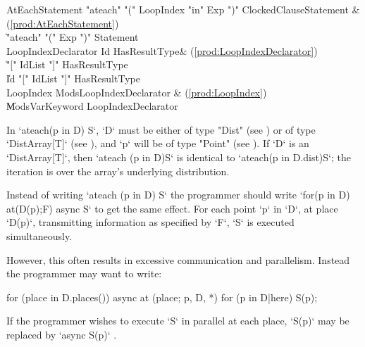 \begin{bbgrammar}
     AtEachStatement \: \xcd"ateach" \xcd"(" LoopIndex \xcd"in" Exp \xcd")" ClockedClause\opt Statement & (\ref{prod:AtEachStatement}) \\
                    \| \xcd"ateach" \xcd"(" Exp \xcd")" Statement \\
 LoopIndexDeclarator \: Id HasResultType\opt & (\ref{prod:LoopIndexDeclarator}) \\
                    \| \xcd"[" IdList \xcd"]" HasResultType\opt \\
                    \| Id \xcd"[" IdList \xcd"]" HasResultType\opt \\
           LoopIndex \: Mods\opt LoopIndexDeclarator & (\ref{prod:LoopIndex}) \\
                    \| Mods\opt VarKeyword LoopIndexDeclarator \\
\end{bbgrammar}
In \xcd`ateach(p in D) S`, \xcd`D` must be either of type \xcd"Dist"
(see ) or of type \xcd`DistArray[T]` (see
), and \xcd`p` will be of type \xcd"Point" (see
). If \xcd`D` is an \xcd`DistArray[T]`, then
\xcd`ateach (p in D)S` is identical to 
\xcd`ateach(p in D.dist)S`; the iteration is over the array's underlying
distribution.   

Instead of writing \xcd`ateach (p in D) S` the programmer should write 
\xcd`for(p in D) at(D(p);F) async S` to get the same effect. 
For each point \xcd`p` in \xcd`D`, at place \xcd`D(p)`, transmitting
information as specified by \xcd`F`, 
\xcd`S` is
executed simultaneously.

However, this often results in excessive communication and parallelism. Instead the
programmer may want to write: 
\begin{xten}
for (place in D.places()) async at (place; p, D, *) {
    for (p in D|here) {
        S(p);
    }
}
\end{xten}

If the programmer wishes to execute \xcd`S` in parallel at each place,
\xcd`S(p)` may be replaced by 
\xcd`async S(p)`
.




